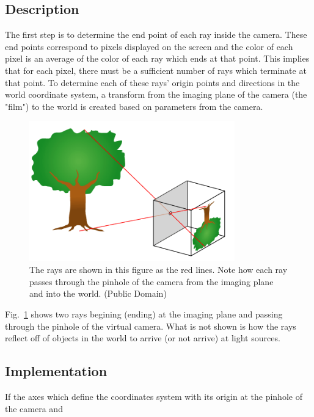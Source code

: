 \documentclass{article}
\begin{document}
\subsection{Description}
The first step is to determine the end point of each ray inside the camera. These end points correspond to 
pixels displayed on the screen and the color of each pixel is an average of the color of each ray which ends
at that point. This implies that for each pixel, there must be a sufficient number of rays which terminate
at that point. To determine each of these rays' origin points and directions in the world coordinate system,
a transform from the imaging plane of the camera (the "film") to the world is created based on parameters from the camera.

\begin{figure}[!t]
\centering
\includegraphics[width=3.5in]{./imgs/Pinhole-camera}
\caption{The rays are shown in this figure as the red lines. Note how each ray passes through the pinhole
of the camera from the imaging plane and into the world. (Public Domain)}
\label{fig:pinhole}
\end{figure}

Fig.~\ref{fig:pinhole} shows two rays begining (ending) at the imaging plane and passing through the pinhole
of the virtual camera. What is not shown is how the rays reflect off of objects in the world to arrive
 (or not arrive) at light sources.

\subsection{Implementation}
If the axes which define the coordinates system with its origin at the pinhole of the camera and 
\end{document}
